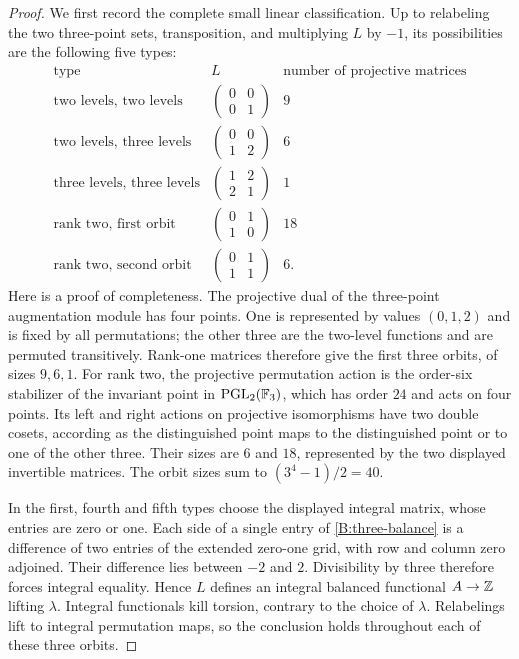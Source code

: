\begin{proof}
We first record the complete small linear classification. Up to
relabeling the two three-point sets, transposition, and multiplying
$L$ by $-1$, its possibilities are the following five types:
\[
\begin{array}{c|c|c}
\text{type}&L&\text{number of projective matrices}\\ \hline
\text{two levels, two levels}&
 \left(\begin{smallmatrix}0&0\\0&1\end{smallmatrix}\right)&9\\
\text{two levels, three levels}&
 \left(\begin{smallmatrix}0&0\\1&2\end{smallmatrix}\right)&6\\
\text{three levels, three levels}&
 \left(\begin{smallmatrix}1&2\\2&1\end{smallmatrix}\right)&1\\
\text{rank two, first orbit}&
 \left(\begin{smallmatrix}0&1\\1&0\end{smallmatrix}\right)&18\\
\text{rank two, second orbit}&
 \left(\begin{smallmatrix}0&1\\1&1\end{smallmatrix}\right)&6.
\end{array}
\]
Here is a proof of completeness. The projective dual of the
three-point augmentation module has four points. One is represented
by values $(0,1,2)$ and is fixed by all permutations; the other three
are the two-level functions and are permuted transitively. Rank-one
matrices therefore give the first three orbits, of sizes $9,6,1$.
For rank two, the projective permutation action is the order-six
stabilizer of the invariant point in
$\operatorname{PGL}_2(\mathbb F_3)$, which has order $24$ and acts on four
points. Its left and right actions on projective isomorphisms have
two double cosets, according as the distinguished point maps to the
distinguished point or to one of the other three. Their sizes are
$6$ and $18$, represented by the two displayed invertible matrices.
The orbit sizes sum to $(3^4-1)/2=40$.

In the first, fourth and fifth types choose the displayed integral
matrix, whose entries are zero or one. Each side of a single entry
of \eqref{B:three-balance} is a difference of two entries of the
extended zero-one grid, with row and column zero adjoined. Their
difference lies between $-2$ and $2$. Divisibility by three therefore
forces integral equality. Hence $L$ defines an integral balanced
functional $A\to\mathbb Z$ lifting $\lambda$. Integral functionals kill
torsion, contrary to the choice of $\lambda$. Relabelings lift to
integral permutation maps, so the conclusion holds throughout each
of these three orbits.


\end{proof}
